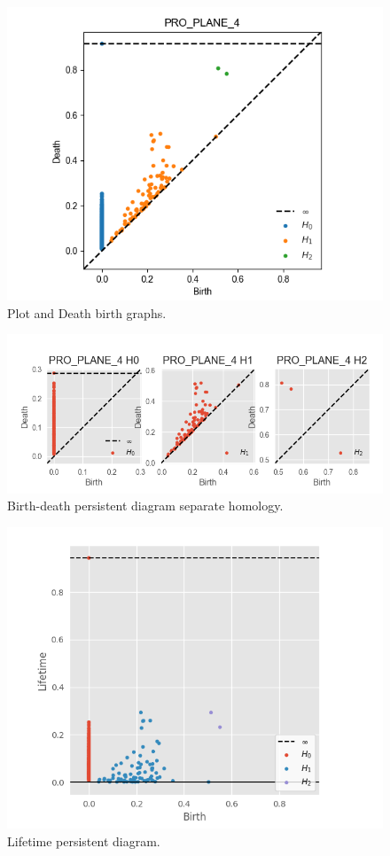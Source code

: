 \documentclass[11pt,a4paper]{report}
\begin{document}
              \begin{figure}[H]
                \centering
                \includegraphics[width=\linewidth]{./ripser/on_PP4.png}
                \caption{Plot and Death birth graphs.}
                \label{fig:sep hom}
              \end{figure}

              \begin{figure}[H]
                \centering
                \includegraphics[width=\linewidth]{./ripser/on_PP4_sep.png}
                \caption{Birth-death persistent diagram separate homology.}
                \label{fig:sep hom}
              \end{figure}

              \begin{figure}[H]
                \centering
                \includegraphics[width=0.5\linewidth, scale=0.5]{./ripser/on_PP4_lifetime.png}
                \caption{Lifetime persistent diagram.}
                \label{fig:sep hom}
              \end{figure}
              
\end{document}
